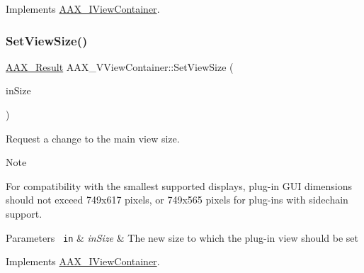 Implements \mbox{\hyperlink{a01889_ac2fe16f6d81a8d941e36242d9f9d0980}{A\+A\+X\+\_\+\+I\+View\+Container}}.

\mbox{\label{a01945_a7c0ca66b8b7b79c5b97f987c60ebbefc}} 
\subsubsection{\texorpdfstring{SetViewSize()}{SetViewSize()}}
{\footnotesize\ttfamily \mbox{\hyperlink{a00392_a4d8f69a697df7f70c3a8e9b8ee130d2f}{A\+A\+X\+\_\+\+Result}} A\+A\+X\+\_\+\+V\+View\+Container\+::\+Set\+View\+Size (\begin{DoxyParamCaption}\item[{\mbox{\hyperlink{a01609}{A\+A\+X\+\_\+\+Point}} \&}]{in\+Size }\end{DoxyParamCaption})\hspace{0.3cm}{\ttfamily [virtual]}}



Request a change to the main view size. 

\begin{DoxyNote}{Note}
\begin{DoxyItemize}
\item For compatibility with the smallest supported displays, plug-\/in G\+UI dimensions should not exceed 749x617 pixels, or 749x565 pixels for plug-\/ins with sidechain support.\end{DoxyItemize}

\end{DoxyNote}

\begin{DoxyParams}[1]{Parameters}
\mbox{\texttt{ in}}  & {\em in\+Size} & The new size to which the plug-\/in view should be set \\
\hline
\end{DoxyParams}


Implements \mbox{\hyperlink{a01889_ad750e9f0231c61ab32114276ee8cb5f7}{A\+A\+X\+\_\+\+I\+View\+Container}}.

\mbox{\label{a01945_a9f59dafeb761114a943463a3339593ae}} 
